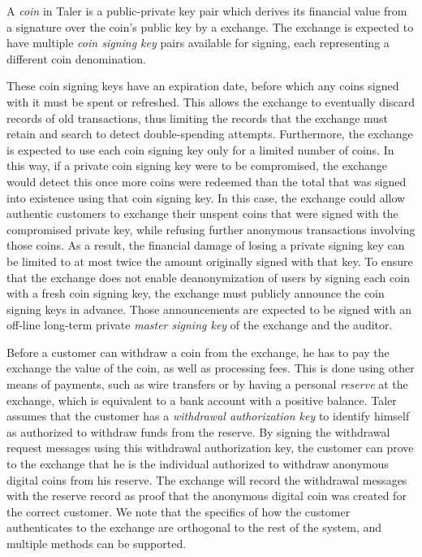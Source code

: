 \documentclass{llncs}
\begin{document}
A \emph{coin} in Taler is a public-private key pair which derives its
financial value from a signature over the coin's public key by a exchange.
The exchange is expected to have multiple {\em coin signing key} pairs
available for signing, each representing a different coin
denomination.

These coin signing keys have an expiration date, before which any coins
signed with it must be spent or refreshed.  This allows the exchange to
eventually discard records of old transactions, thus limiting the
records that the exchange must retain and search to detect double-spending
attempts.  Furthermore, the exchange is expected to use each coin signing
key only for a limited number of coins.
In this way, if a private coin signing key were to be compromised,
the exchange would detect this once more coins were redeemed than the total
that was signed into existence using that coin signing key.
In this case, the exchange could allow authentic customers to exchange their
unspent coins that were signed with the compromised private key,
while refusing further anonymous transactions involving those coins.
As a result, the financial damage of losing a private signing key can be
limited to at most twice the amount originally signed with that key.
To ensure that the exchange does not enable deanonymization of users by
signing each coin with a fresh coin signing key, the exchange must publicly
announce the coin signing keys in advance.  Those announcements are
expected to be signed with an off-line long-term private {\em master
signing key} of the exchange and the auditor.

Before a customer can withdraw a coin from the exchange,
he has to pay the exchange the value of the coin, as well as processing fees.
This is done using other means of payments, such as wire transfers or
by having a personal {\em reserve} at the exchange,
 which is equivalent to a bank account with a positive balance.
Taler assumes that the customer has a {\em withdrawal authorization key}
to identify himself as authorized to withdraw funds from the reserve.
By signing the withdrawal request messages using this withdrawal
authorization key, the customer can prove to the exchange that he is the
individual authorized to withdraw anonymous digital coins from his reserve.
The exchange will record the withdrawal messages with the reserve record as
proof that the anonymous digital coin was created for the correct
customer.  We note that the specifics of how the customer authenticates
to the exchange are orthogonal to the rest of the system, and
 multiple methods can be supported.
\end{document}
